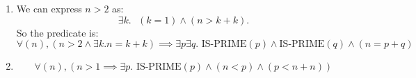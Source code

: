 \documentclass[11pt]{article}
\begin{document}
\begin{enumerate}
\begin{enumerate}
  \item
    We can express $n > 2$ as:
    \begin{equation}
      \exists{k}. \text{ }(k = 1) \land (n > k+k).
    \end{equation}
    So the predicate is:
    \begin{equation}
      \forall(n), (n > 2 \land \exists{k}. n=k+k) \implies
      \exists{p}\exists{q}. \text{ IS-PRIME}(p) \land \text{
        IS-PRIME}(q) \land (n = p + q) 
    \end{equation}

  \item
    \begin{equation}
      \forall(n), (n > 1 \implies
      \exists{p}. \text{ IS-PRIME}(p) \land (n < p) \land (p < n+n))
    \end{equation}

  \end{enumerate}

\end{enumerate}
\end{document}
